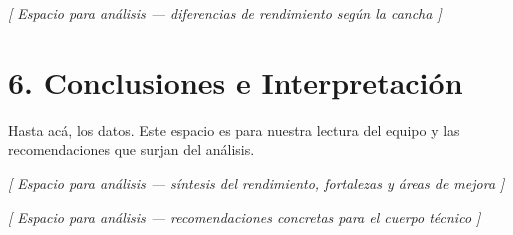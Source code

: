 \documentclass[11pt, a4paper]{article}
\newcommand{\slot}[1]{%
  \par\noindent\colorbox{slotgray}{%
    \parbox{\dimexpr\textwidth-2\fboxsep\relax}{%
      \raggedright\smallskip
      \small\textit{\color{darkgray}[ Espacio para análisis — #1 ]}\par\smallskip}}%
  \par\vspace{3mm}}
\begin{document}
\slot{diferencias de rendimiento según la cancha}

\section*{6. Conclusiones e Interpretación}
Hasta acá, los datos. Este espacio es para nuestra lectura del equipo y las recomendaciones que surjan del análisis.

\slot{síntesis del rendimiento, fortalezas y áreas de mejora}

\slot{recomendaciones concretas para el cuerpo técnico}
\end{document}
